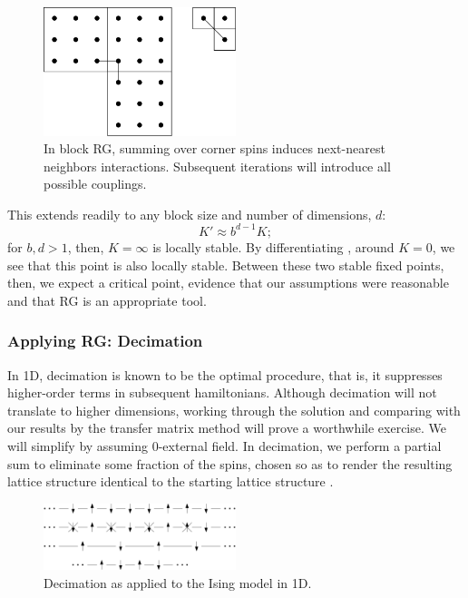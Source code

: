 \begin{figure}[ht]
  \centering
  \includegraphics[width=0.5\textwidth]{figures/ising-2d-higher-order.png}
  \caption{In block RG, summing over corner spins induces next-nearest
    neighbors interactions. Subsequent iterations will introduce all
    possible couplings.\label{fig:ising-block-couplings} }
\end{figure}


This extends readily to any block size and number of dimensions, $d$:%
\begin{equation}%
  K'\approx b^{d-1} K;
\end{equation}%
for $b,d>1$, then, $K=\infty$ is locally stable. By differentiating
, around $K=0$, we see that
this point is also locally stable. Between these two stable fixed
points, then, we expect a critical point, evidence that our assumptions
were reasonable and that RG is an appropriate tool.


\subsubsection{Applying RG\@: Decimation}
In 1D, decimation is known to be the optimal procedure, that is, it
suppresses higher-order terms in subsequent hamiltonians. Although
decimation will not translate to higher dimensions, working through
the solution and comparing with our results by the transfer matrix
method will prove a worthwhile exercise. We will simplify by assuming
$0$-external field. In decimation, we perform a partial sum to
eliminate some fraction of the spins, chosen so as to render the
resulting lattice structure identical to the starting lattice
structure
. %

\begin{figure}[ht]
  \centering
  \includegraphics[width=0.5\textwidth]{figures/decimation.png}
  \caption{Decimation as applied to the Ising model in
    1D.\label{fig:decimation} }
\end{figure}

